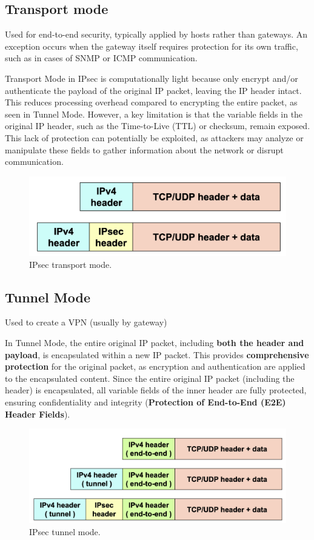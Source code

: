 \subsection{Transport mode}
Used for end-to-end security, typically applied by hosts rather than gateways. An exception occurs when the gateway itself requires protection for its own traffic, such as in cases of SNMP or ICMP communication.

Transport Mode in IPsec is computationally light because only encrypt and/or authenticate the payload of the original IP packet, leaving the IP header intact. This reduces processing overhead compared to encrypting the entire packet, as seen in Tunnel Mode. However, a key limitation is that the variable fields in the original IP header, such as the Time-to-Live (TTL) or checksum, remain exposed. This lack of protection can potentially be exploited, as attackers may analyze or manipulate these fields to gather information about the network or disrupt communication.

\begin{figure}[H]
    \includegraphics[width=\linewidth]{Images/NetSec/ipsec_transport_mode.png}
    \caption{IPsec transport mode.}
\end{figure}

\subsection{Tunnel Mode}
Used to create a VPN (usually by gateway)

In Tunnel Mode, the entire original IP packet, including \textbf{both the header and payload}, is encapsulated within a new IP packet. This provides \textbf{comprehensive protection} for the original packet, as encryption and authentication are applied to the encapsulated content. Since the entire original IP packet (including the header) is encapsulated, all variable fields of the inner header are fully protected, ensuring confidentiality and integrity (\textbf{Protection of End-to-End (E2E) Header Fields}).

\begin{figure}[H]
    \includegraphics[width=\linewidth]{Images/NetSec/ipsec_tunnel_mode.png}
    \caption{IPsec tunnel mode.}
\end{figure}

